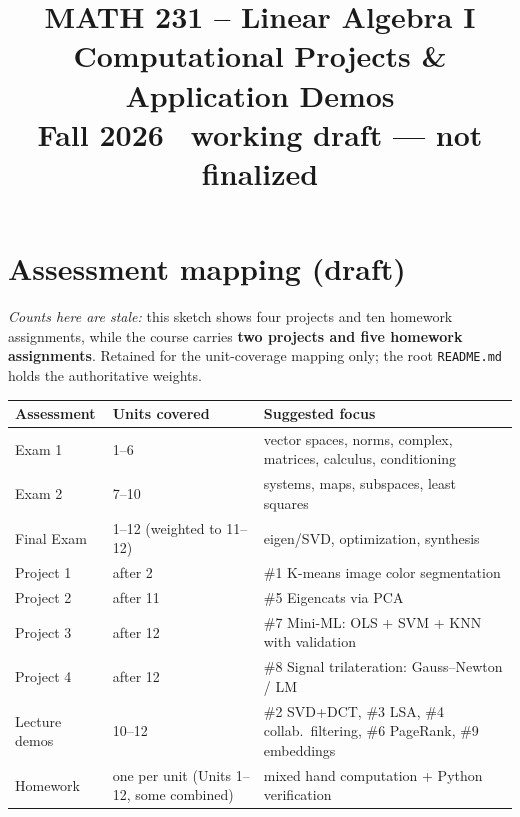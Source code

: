 \documentclass[11pt]{article}
\title{\vspace{-1.2cm}\textbf{\sffamily MATH 231 -- Linear Algebra I}\\[4pt]
       {\large\sffamily Computational Projects \& Application Demos}\\[2pt]
       {\normalsize\sffamily Fall 2026 \textbullet\ working draft --- not finalized}}
\author{}
\date{}
\begin{document}
\maketitle
\vspace{-1.3cm}

\begin{center}
\end{center}

\bigskip

\section{Assessment mapping (draft)}
\noindent\emph{Counts here are stale:} this sketch shows four projects and ten
homework assignments, while the course carries \textbf{two projects and five
homework assignments}. Retained for the unit-coverage mapping only; the root
\texttt{README.md} holds the authoritative weights.

\begin{center}
\renewcommand{\arraystretch}{1.3}
\begin{tabular}{@{}l p{4.0cm} p{6.4cm}@{}}
\toprule
\textbf{Assessment} & \textbf{Units covered} & \textbf{Suggested focus} \\
\midrule
Exam 1              & 1--6    & vector spaces, norms, complex, matrices, calculus, conditioning \\
Exam 2              & 7--10   & systems, maps, subspaces, least squares \\
Final Exam & 1--12 (weighted to 11--12) & eigen/SVD, optimization, synthesis \\
\midrule
Project 1 & after 2  & \#1 K-means image color segmentation \\
Project 2 & after 11 & \#5 Eigencats via PCA \\
Project 3 & after 12 & \#7 Mini-ML: OLS + SVM + KNN with validation \\
Project 4 & after 12 & \#8 Signal trilateration: Gauss--Newton / LM \\
Lecture demos & 10--12 & \#2 SVD+DCT, \#3 LSA, \#4 collab.\ filtering, \#6 PageRank, \#9 embeddings \\
\midrule
Homework & one per unit (Units 1--12, some combined) & mixed hand computation + Python verification \\
\bottomrule
\end{tabular}
\end{center}
\end{document}
